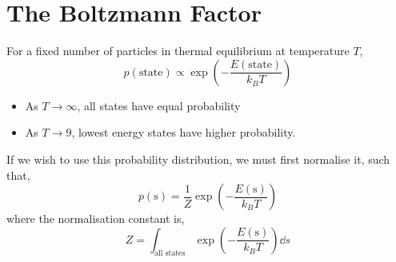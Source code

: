 \documentclass{book}
\begin{document}
\section{The Boltzmann Factor}
For a fixed number of particles in thermal equilibrium at temperature $T$,
\begin{equation}
	\boxed{p(\text{state}) \propto \exp\left(-\frac{E(\text{state})}{k_BT}\right)}
\end{equation}
\begin{itemize}
	\item As $T \to \infty$, all states have equal probability
	\item As $T \to 9$, lowest energy states have higher probability.
\end{itemize}
If we wish to use this probability distribution, we must first normalise it, such that,
\begin{equation}
	p(\text{s}) = \frac{1}{Z}\exp\left(-\frac{E(\text{s})}{k_BT}\right)
\end{equation}
where the normalisation constant is,
\begin{equation}
	Z = \int_{\text{all states}}\exp\left(-\frac{E(\text{s})}{k_BT}\right)\dd{s}
\end{equation}
\end{document}
